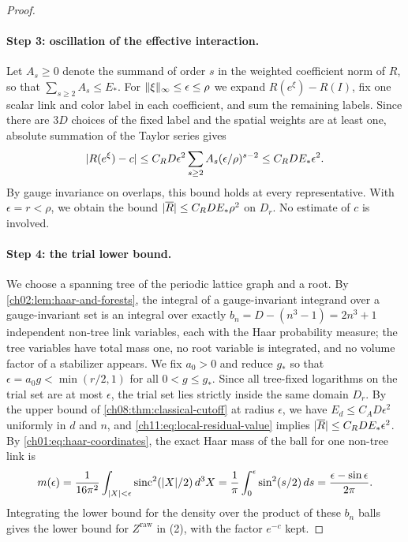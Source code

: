 \begin{proof}
\paragraph{Step 3: oscillation of the effective interaction.}
Let $A_s\ge0$ denote the summand of order $s$ in the weighted coefficient norm of $R$, so that $\sum_{s\ge2}A_s\le E_*$. For $\lVert \xi\rVert_\infty\le\epsilon\le\rho$ we expand $R(e^\xi)-R(I)$, fix one scalar link and color label in each coefficient, and sum the remaining labels. Since there are $3D$ choices of the fixed label and the spatial weights are at least one, absolute summation of the Taylor series gives
\begin{equation}\label{ch11:eq:local-residual-value}
 \lvert R(e^\xi)-c\rvert\le C_RD\epsilon^2\sum_{s\ge2}A_s(\epsilon/\rho)^{s-2}\le C_RDE_*\epsilon^2.
\end{equation}
By gauge invariance on overlaps, this bound holds at every representative. With $\epsilon=r<\rho$, we obtain the bound $\lvert \overline R\rvert\le C_RDE_*\rho^2$ on $D_r$. No estimate of $c$ is involved.

\paragraph{Step 4: the trial lower bound.}
We choose a spanning tree of the periodic lattice graph and a root. By \cref{ch02:lem:haar-and-forests}, the integral of a gauge-invariant integrand over a gauge-invariant set is an integral over exactly $b_n=D-(n^3-1)=2n^3+1$ independent non-tree link variables, each with the Haar probability measure; the tree variables have total mass one, no root variable is integrated, and no volume factor of a stabilizer appears. We fix $a_0>0$ and reduce $g_*$ so that $\epsilon=a_0g<\min(r/2,1)$ for all $0<g\le g_*$. Since all tree-fixed logarithms on the trial set are at most $\epsilon$, the trial set lies strictly inside the same domain $D_r$. By the upper bound of \cref{ch08:thm:classical-cutoff} at radius $\epsilon$, we have $E_d\le C_AD\epsilon^2$ uniformly in $d$ and $n$, and \eqref{ch11:eq:local-residual-value} implies $\lvert \overline R\rvert\le C_RDE_*\epsilon^2$. By \eqref{ch01:eq:haar-coordinates}, the exact Haar mass of the ball for one non-tree link is
\[
 m(\epsilon)=\frac1{16\pi^2}\int_{\lvert X\rvert<\epsilon}\operatorname{sinc}^2(\lvert X\rvert/2)\,d^3X
 =\frac1\pi\int_0^\epsilon\sin^2(s/2)\,ds=\frac{\epsilon-\sin\epsilon}{2\pi}.
\]
Integrating the lower bound for the density over the product of these $b_n$ balls gives the lower bound for $Z^{\mathrm{raw}}$ in (2), with the factor $e^{-c}$ kept.


\end{proof}
